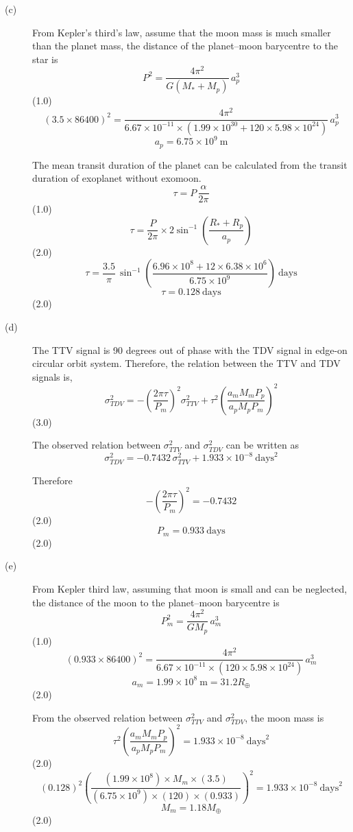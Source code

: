 \begin{description}
\item[(c)] From Kepler's third's law, assume that the moon mass is much
smaller than the planet mass, the distance of the planet--moon barycentre to
the star is
\[ P^2 = \frac{4\pi^2}{G(M_* + M_p)}\,a_p^3 \]
\hfill(1.0)
\[ (3.5\times86400)^2
   = \frac{4\pi^2}{6.67\times10^{-11}\times(1.99\times10^{30}
     + 120\times5.98\times10^{24})}\,a_p^3 \]
\[ a_p = 6.75\times10^{9}\ \mathrm{m} \]

The mean transit duration of the planet can be calculated from the transit
duration of exoplanet without exomoon.
\[ \tau = P\,\frac{\alpha}{2\pi} \]
\hfill(1.0)
\[ \tau = \frac{P}{2\pi}\times 2\sin^{-1}\!\left(\frac{R_* + R_p}{a_p}\right) \]
\hfill(2.0)
\[ \tau = \frac{3.5}{\pi}\,\sin^{-1}\!\left(
   \frac{6.96\times10^{8} + 12\times6.38\times10^{6}}{6.75\times10^{9}}\right)
   \ \mathrm{days} \]
\[ \tau = 0.128\ \mathrm{days} \]
\hfill(2.0)

\item[(d)] The TTV signal is 90 degrees out of phase with the TDV signal in
edge-on circular orbit system. Therefore, the relation between the TTV and TDV
signals is,
\[ \sigma_{TDV}^2 = -\left(\frac{2\pi\tau}{P_m}\right)^2\sigma_{TTV}^2
   + \tau^2\left(\frac{a_m M_m P_p}{a_p M_p P_m}\right)^2 \]
\hfill(3.0)

The observed relation between $\sigma_{TTV}^2$ and $\sigma_{TDV}^2$ can be
written as
\[ \sigma_{TDV}^2 = -0.7432\,\sigma_{TTV}^2 + 1.933\times10^{-8}\ \mathrm{days}^2 \]

Therefore
\[ -\left(\frac{2\pi\tau}{P_m}\right)^2 = -0.7432 \]
\hfill(2.0)
\[ P_m = 0.933\ \mathrm{days} \]
\hfill(2.0)

\item[(e)] From Kepler third law, assuming that moon is small and can be
neglected, the distance of the moon to the planet--moon barycentre is
\[ P_m^2 = \frac{4\pi^2}{GM_p}\,a_m^3 \]
\hfill(1.0)
\[ (0.933\times86400)^2
   = \frac{4\pi^2}{6.67\times10^{-11}\times(120\times5.98\times10^{24})}\,a_m^3 \]
\[ a_m = 1.99\times10^{8}\ \mathrm{m} = 31.2 R_\oplus \]
\hfill(2.0)

From the observed relation between $\sigma_{TTV}^2$ and $\sigma_{TDV}^2$, the
moon mass is
\[ \tau^2\left(\frac{a_m M_m P_p}{a_p M_p P_m}\right)^2
   = 1.933\times10^{-8}\ \mathrm{days}^2 \]
\hfill(2.0)
\[ (0.128)^2\left(\frac{(1.99\times10^{8})\times M_m\times(3.5)}
   {(6.75\times10^{9})\times(120)\times(0.933)}\right)^2
   = 1.933\times10^{-8}\ \mathrm{days}^2 \]
\[ M_m = 1.18 M_\oplus \]
\hfill(2.0)


\end{description}
